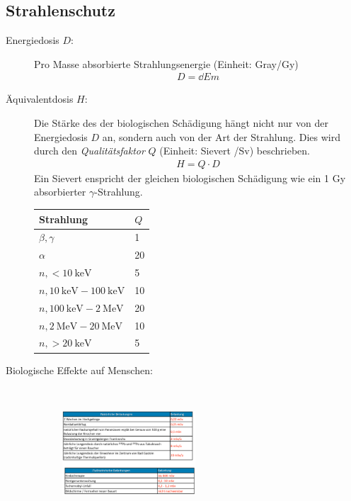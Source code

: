 \documentclass[twocolumn]{summery_4.1}
\begin{document}
\subsection{Strahlenschutz}
\begin{description}
    \item[Energiedosis \(D\):] Pro Masse absorbierte Strahlungsenergie (Einheit: Gray/Gy)
    \begin{align*}
        D = \dd Em
    \end{align*}
    \item[Äquivalentdosis \(H\):] Die Stärke des der biologischen Schädigung hängt nicht nur von der Energiedosis \(D\) an, sondern auch von der Art der Strahlung. Dies wird durch den \emph{Qualitätsfaktor} \(Q\) (Einheit: Sievert 
    /Sv) beschrieben. 
    \begin{align*}
        H = Q\cdot D
    \end{align*}
    Ein Sievert enspricht der gleichen biologischen Schädigung wie ein 1 Gy absorbierter \(\gamma\)-Strahlung.
    \begin{center}
    \begin{tabular}{@{}ll@{}}
        \toprule
        {\bf Strahlung} & \(Q\)\\
        \midrule
        \(\beta,\gamma\)& 1 \\
        \(\alpha\) & 20 \\
        \(n,<\SI{10}\keV\) & 5 \\
        \(n,\SI{10}\keV-\SI{100}\keV\) & 10 \\
        \(n,\SI{100}\keV-\SI{2}\MeV\) & 20 \\
        \(n,\SI{2}\MeV-\SI{20}\MeV\) & 10 \\
        \(n,>\SI{20}\keV\) & 5 \\
        \bottomrule
    \end{tabular}
    \end{center}
    
    \item[Biologische Effekte auf Menschen:]\,
    \begin{figure}[H]
        \centering
        \includegraphics[width=0.49\textwidth]{Strahlung_Quellen.png}
    \end{figure}
    

\end{description}
\end{document}
